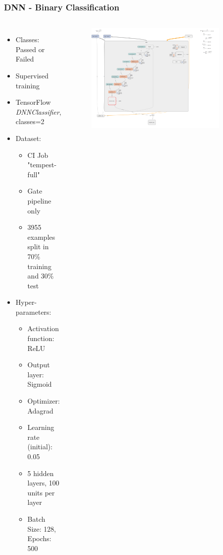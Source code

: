 \documentclass[aspectratio=169,11pt,hyperref={colorlinks=true}]{beamer}
\begin{document}
\begin{frame}
    \frametitle{DNN - Binary Classification}
    \begin{columns}
        \begin{itemize}
            \item{Classes: Passed or Failed}
            \item{Supervised training}
            \item{TensorFlow \emph{DNNClassifier}, classes=2}
            \item{Dataset:}
            \begin{itemize}
              \item{CI Job "tempest-full"}
              \item{Gate pipeline only}
              \item{3955 examples split in 70\% training and 30\% test}
            \end{itemize}
            \item{Hyper-parameters:}
            \begin{itemize}
              \item{Activation function: ReLU}
              \item{Output layer: Sigmoid}
              \item{Optimizer: Adagrad}
              \item{Learning rate (initial): 0.05}
              \item{5 hidden layers, 100 units per layer}
              \item{Batch Size: 128, Epochs: 500}
            \end{itemize}
        \end{itemize}
        \begin{figure}
        \begin{center}
          \includegraphics[width=0.9\textwidth]{diagrams/binary_class_network_diagram.png}

\end{center}
\end{figure}
\end{columns}
\end{frame}
\end{document}

